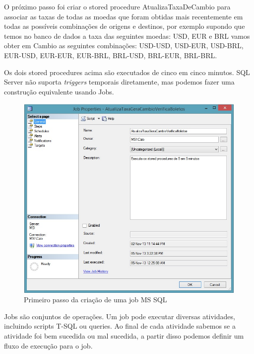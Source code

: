 \documentclass[conference]{IEEEtran}
\begin{document}
  	O próximo passo foi criar o stored procedure AtualizaTaxaDeCambio para associar as taxas de todas as moedas que foram obtidas mais recentemente em todas as possíveis combinações de origens e destinos, por exemplo supondo que temos no banco de dados a taxa das seguintes moedas: USD, EUR e BRL vamos obter em Cambio as seguintes combinações: USD-USD, USD-EUR, USD-BRL, EUR-USD, EUR-EUR, EUR-BRL, BRL-USD, BRL-EUR, BRL-BRL.

  	Os dois stored procedures acima são executados de cinco em cinco minutos. SQL Server não suporta \textit{triggers} temporais diretamente, mas podemos fazer uma construção equivalente usando Jobs. 

    \begin{figure}[!t]
      \centering
  	  \includegraphics[scale=0.45]{img/job1.jpg}
      \caption{Primeiro passo da criação de uma job MS SQL}
    \end{figure}

  	Jobs são conjuntos de operações. Um job pode executar diversas atividades, incluindo scripts T-SQL ou queries. Ao final de cada atividade sabemos se a atividade foi bem sucedida ou mal sucedida, a partir disso podemos definir um fluxo de execução para o job.
  	
\end{document}
